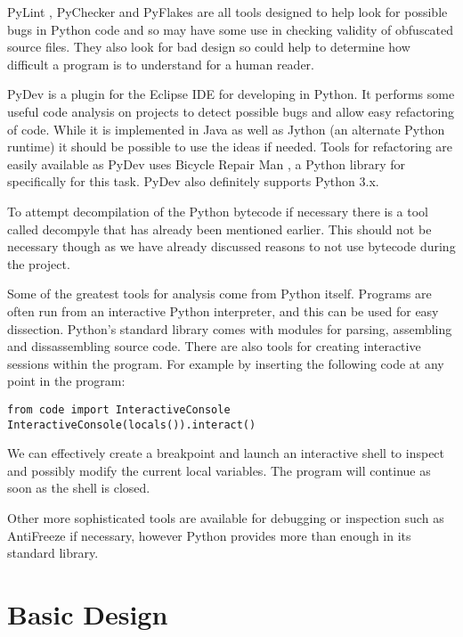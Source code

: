 \documentclass{report}
\begin{document}
PyLint \cite{pylint}, PyChecker \cite{pychecker} and PyFlakes \cite{pyflakes} are all tools designed to help look for possible
bugs in Python code and so may have some use in checking validity of obfuscated source files. They also look for bad design so
could help to determine how difficult a program is to understand for a human reader.

PyDev \cite{pydev} is a plugin for the Eclipse IDE for developing in Python. It performs some useful code analysis on projects to detect
possible bugs and allow easy refactoring of code. While it is implemented in Java as well as Jython (an alternate Python runtime)
it should be possible to use the ideas if needed. Tools for refactoring are easily available as PyDev uses Bicycle Repair
Man \cite{bikerepair}, a Python library for specifically for this task. PyDev also definitely supports Python 3.x.

To attempt decompilation of the Python bytecode if necessary there is a tool called decompyle \cite{decompyle} that has already been
mentioned earlier. This should not be necessary though as we have already discussed reasons to not use bytecode during the project.

Some of the greatest  tools for analysis come from Python itself. Programs are often run from an interactive Python interpreter, and this
can be used for easy dissection. Python's standard library comes with modules for parsing, assembling and dissassembling source code.
There are also tools for creating interactive sessions within the program. For example by inserting the following code at any point
in the program:

\begin{lstlisting}
from code import InteractiveConsole
InteractiveConsole(locals()).interact()
\end{lstlisting}

We can effectively create a breakpoint and launch an interactive shell to inspect and possibly modify the current local
variables. The program will continue as soon as the shell is closed.

Other more sophisticated tools are available for debugging or inspection such as AntiFreeze \cite{pirates} if necessary,
however Python provides more than enough in its standard library.

\section{Basic Design}
\end{document}
